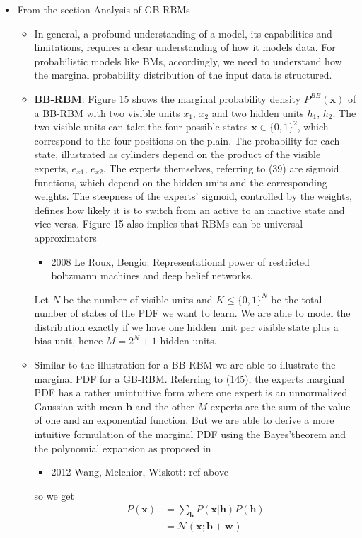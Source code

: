 \documentclass[twoside,english]{uiofysmaster}
\begin{document}
\begin{itemize}
\begin{itemize}
	\end{itemize}
	\item From the section Analysis of GB-RBMs
	\begin{itemize}
		\item In general, a profound understanding of a model, its capabilities and limitations, requires a clear understanding of how it models data. For probabilistic models like BMs, accordingly, we need to understand how the marginal probability distribution of the input data is structured.
		\item \textbf{BB-RBM}: Figure 15 shows the marginal probability density $P^{BB} (\bm{x})$ of a BB-RBM with two visible units $x_1$, $x_2$ and two hidden units $h_1$, $h_2$. The two visible units can take the four possible states $\bm{x} \in \{ 0,1 \}^2$, which correspond to the four positions on the plain. The probability for each state, illustrated as cylinders depend on the product of the visible experts, $e_{x1}$, $e_{x2}$. The experts themselves, referring to (39) are sigmoid functions, which depend on the hidden units and the corresponding weights. The steepness of the experts’ sigmoid, controlled by the weights, defines how likely it is to switch from an active to an inactive state and vice versa. Figure 15 also implies that RBMs can be universal approximators
		\begin{itemize}
			\item 2008 Le Roux, Bengio: Representational power of restricted boltzmann machines and deep belief networks. \cite{LeRoux2008} 
		\end{itemize}
		Let $N$ be the number of visible units and $K \leq \{ 0,1 \}^N$ be the total number of states of the PDF we want to learn. We are able to model the distribution exactly if we have one hidden unit per visible state plus a bias unit, hence $M=2^N + 1$ hidden units.
		\item Similar to the illustration for a BB-RBM we are able to illustrate the marginal PDF for a GB-RBM. Referring to (145), the experts marginal PDF has a rather unintuitive form where one expert is an unnormalized Gaussian with mean $\bm{b}$ and the other $M$ experts are the sum of the value of one and an exponential function. But we are able to derive a more intuitive formulation of the marginal PDF using the Bayes’theorem and the polynomial expansion as proposed in
		\begin{itemize}
			\item 2012 Wang, Melchior, Wiskott: ref above \cite{Wang2012}
		\end{itemize}
		so we get
		\begin{align}
			P(\bm{x}) &= \sum_{\bm{h}} P(\bm{x}|\bm{h}) P(\bm{h}) \\
			&= \mathcal{N} (\bm{x}; \bm{b} + \bm{w}_{})
		\end{align}
	\end{itemize}
\end{itemize}
\end{document}
